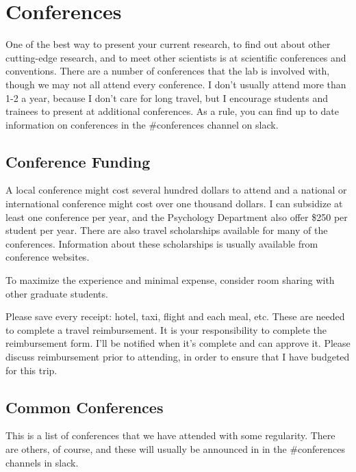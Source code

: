 \documentclass{article}
\begin{document}
\section{Conferences}\label{sec:Conf}
One of the best way to present your current research, to find out about other cutting-edge research, and to meet other scientists is at scientific conferences and conventions. There are a number of conferences that the lab is involved with, though we may not all attend every conference. I don't usually attend more than 1-2 a year, because I don't care for long travel, but I encourage students and trainees to present at additional conferences. As a rule, you can find up to date information on conferences in the \#conferences channel on slack.

\subsection{Conference Funding}
A local conference might cost several hundred dollars to attend and a national or international conference might cost over one thousand dollars. I can subsidize at least one conference per year, and the Psychology Department also offer \$250 per student per year. There are also travel scholarships available for many of the conferences. Information about these scholarships is usually available from conference websites. 

To maximize the experience and minimal expense, consider room sharing with other graduate students.

Please save every receipt: hotel, taxi, flight and each meal, etc. These are needed to complete a travel reimbursement. It is your responsibility to complete the reimbursement form. I'll be notified when it's complete and can approve it. Please discuss reimbursement prior to attending, in order to ensure that I have budgeted for this trip. 


\subsection{Common Conferences}
This is a list of conferences that we have attended with some regularity.  There are others, of course, and these will usually be announced in in the \#conferences channels in slack.
\end{document}
